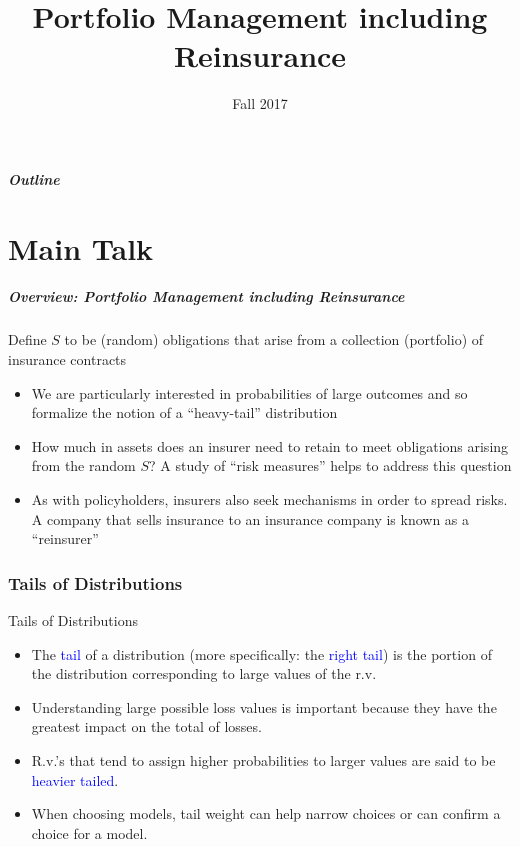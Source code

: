 \documentclass{beamer}
\title[Portfolio Management]{Portfolio Management including Reinsurance}
\date[Fall 2017]{Fall 2017}
\begin{document}
\frame{\titlepage}

\begin{frame}
  \frametitle{Outline}
     \tableofcontents[part=1]
\end{frame}

\part<presentation>{Main Talk}


\begin{frame}%
\frametitle{Overview: Portfolio Management including Reinsurance}
Define $S$ to be (random) obligations that arise from a collection (portfolio) of insurance contracts
\vspace{0.3cm}
\begin{itemize}
\item We are particularly interested in probabilities of large outcomes and so formalize the notion of a ``heavy-tail'' distribution
\item How much in assets does an insurer need to retain to meet obligations arising from the random $S$? A study of ``risk measures'' helps to address this question
\item As with policyholders, insurers also seek mechanisms in order to spread risks. A company that sells insurance to an insurance company is known as a ``reinsurer''
\end{itemize}
\end{frame}

\section{Tails of Distributions}

\begin{frame}{Tails of Distributions}
\begin{itemize}
\item The \textcolor{blue}{tail} of a distribution (more specifically: the \textcolor{blue}{right tail}) is the portion of the distribution corresponding to large values of the r.v.
\vspace{0.3cm}
\item Understanding large possible loss values is important because they have the greatest impact on the total of losses.
\vspace{0.3cm}
\item R.v.'s that tend to assign higher probabilities to larger values are said to be \textcolor{blue}{heavier tailed}.
\vspace{0.3cm}
\item When choosing models, tail weight can help narrow choices or can confirm a choice for a model.
\end{itemize}
\end{frame}
\end{document}
